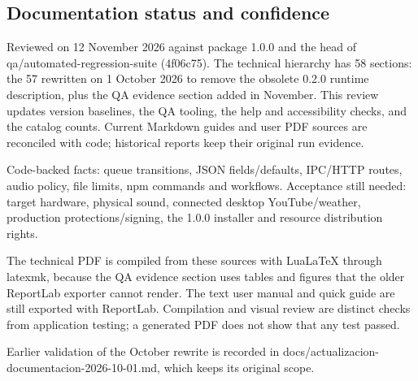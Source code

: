 \subsection{Documentation status and confidence}

Reviewed on 12 November 2026 against package 1.0.0 and the head of qa/automated-regression-suite (4f06c75). The technical hierarchy has 58 sections: the 57 rewritten on 1 October 2026 to remove the obsolete 0.2.0 runtime description, plus the QA evidence section added in November. This review updates version baselines, the QA tooling, the help and accessibility checks, and the catalog counts. Current Markdown guides and user PDF sources are reconciled with code; historical reports keep their original run evidence.

Code-backed facts: queue transitions, JSON fields/defaults, IPC/HTTP routes, audio policy, file limits, npm commands and workflows. Acceptance still needed: target hardware, physical sound, connected desktop YouTube/weather, production protections/signing, the 1.0.0 installer and resource distribution rights.

The technical PDF is compiled from these sources with LuaLaTeX through latexmk, because the QA evidence section uses tables and figures that the older ReportLab exporter cannot render. The text user manual and quick guide are still exported with ReportLab. Compilation and visual review are distinct checks from application testing; a generated PDF does not show that any test passed.

Earlier validation of the October rewrite is recorded in docs/actualizacion-documentacion-2026-10-01.md, which keeps its original scope.
